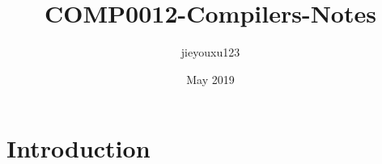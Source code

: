 \documentclass{article}
\title{COMP0012-Compilers-Notes}
\author{jieyouxu123 }
\date{May 2019}
\begin{document}
\maketitle

\section{Introduction}
\end{document}
